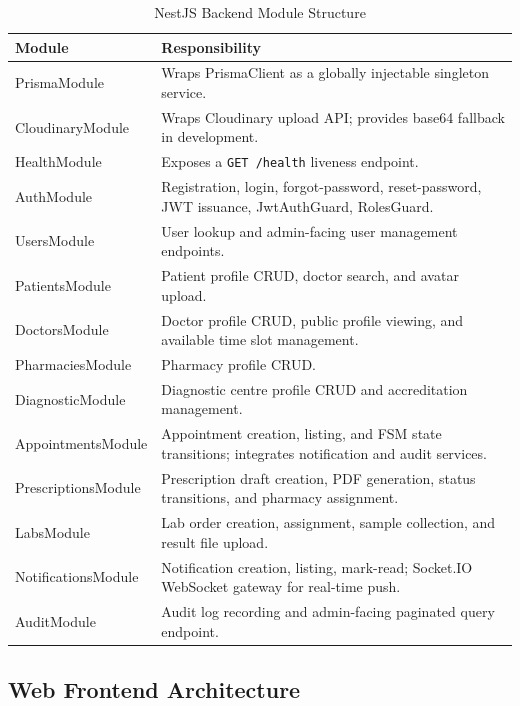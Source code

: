 \documentclass[12pt,a4paper]{report}
\begin{document}
\begin{table}[tbp]
\caption{NestJS Backend Module Structure}
\label{tab:modules}
\centering
\begin{tabular}{|p{3.5cm}|p{9cm}|}
\hline
\textbf{Module} & \textbf{Responsibility}\\
\hline
PrismaModule       & Wraps PrismaClient as a globally injectable singleton service.\\
\hline
CloudinaryModule   & Wraps Cloudinary upload API; provides base64 fallback in development.\\
\hline
HealthModule       & Exposes a \texttt{GET /health} liveness endpoint.\\
\hline
AuthModule         & Registration, login, forgot-password, reset-password, JWT issuance, JwtAuthGuard, RolesGuard.\\
\hline
UsersModule        & User lookup and admin-facing user management endpoints.\\
\hline
PatientsModule     & Patient profile CRUD, doctor search, and avatar upload.\\
\hline
DoctorsModule      & Doctor profile CRUD, public profile viewing, and available time slot management.\\
\hline
PharmaciesModule   & Pharmacy profile CRUD.\\
\hline
DiagnosticModule   & Diagnostic centre profile CRUD and accreditation management.\\
\hline
AppointmentsModule & Appointment creation, listing, and FSM state transitions; integrates notification and audit services.\\
\hline
PrescriptionsModule & Prescription draft creation, PDF generation, status transitions, and pharmacy assignment.\\
\hline
LabsModule         & Lab order creation, assignment, sample collection, and result file upload.\\
\hline
NotificationsModule & Notification creation, listing, mark-read; Socket.IO WebSocket gateway for real-time push.\\
\hline
AuditModule        & Audit log recording and admin-facing paginated query endpoint.\\
\hline
\end{tabular}
\end{table}

\subsection{Web Frontend Architecture}
\end{document}
